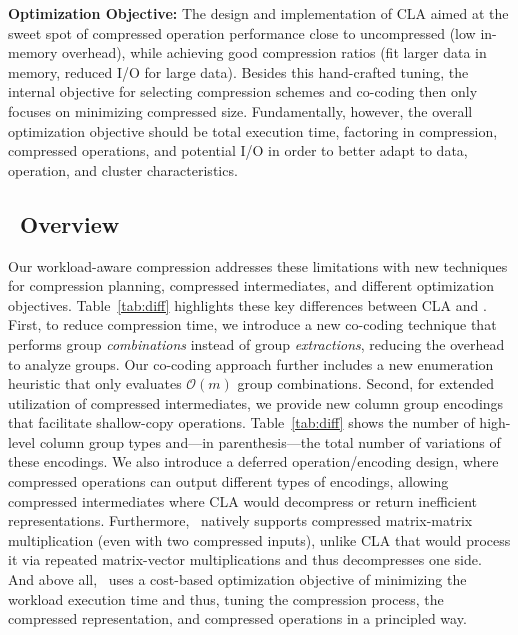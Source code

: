 \textbf{Optimization Objective:}
The design and implementation of CLA aimed at the sweet spot of compressed operation performance close to uncompressed (low in-memory overhead),
while achieving good compression ratios (fit larger data in memory, reduced I/O for large data).
Besides this hand-crafted tuning, the internal objective for selecting compression schemes and co-coding then only focuses on minimizing compressed size.
Fundamentally, however, the overall optimization objective should be total execution time,
factoring in compression, compressed operations, and potential I/O in order to better adapt to data, operation, and cluster characteristics.




\subsection{\name\ Overview}

Our workload-aware compression addresses these limitations with new techniques for compression planning, compressed intermediates, and different optimization objectives. Table~\ref{tab:diff} highlights these key differences between CLA and \name.
%
First, to reduce compression time, we introduce a new co-coding technique that performs group \emph{combinations} instead of group \emph{extractions}, reducing the overhead to analyze groups. Our co-coding approach further includes a new enumeration heuristic that only evaluates $\mathcal{O}(m)$ group combinations.
%
Second, for extended utilization of compressed intermediates, we provide new column group encodings that facilitate shallow-copy operations. Table~\ref{tab:diff} shows the number of high-level column group types and---in parenthesis---the total number of variations of these encodings. We also introduce a deferred operation/encoding design, where compressed operations can output different types of encodings, allowing compressed intermediates where CLA would decompress or return inefficient representations. Furthermore, \name\ natively supports compressed matrix-matrix multiplication (even with two compressed inputs), unlike CLA that would process it via repeated matrix-vector multiplications and thus decompresses one side.
%
And above all, \name\ uses a cost-based optimization objective of minimizing the workload execution time and thus, tuning the compression process, the compressed representation, and compressed operations in a principled way.
